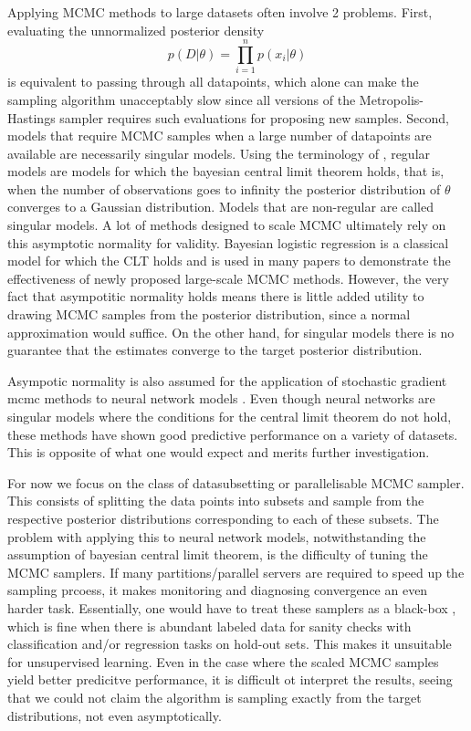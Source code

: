 \documentclass{book}
\begin{document}
\begin{enumerate}
\begin{algorithm}
{\end{algorithm}

Applying MCMC methods to large datasets often involve 2 problems. First, evaluating the unnormalized posterior density
\[ p(D|\theta) = \prod_{i=1}^n p(x_i|\theta) \]
 is equivalent to passing through all datapoints, which alone can make the sampling algorithm unacceptably slow since all versions of the Metropolis-Hastings sampler requires such evaluations for proposing new samples. Second, models that require MCMC samples when a large number of datapoints are available are necessarily singular models. Using the terminology of \cite{watanabe2009algebraic}, regular models are models for which the bayesian central limit theorem \cite{le2012asymptotic} holds, that is, when the number of observations goes to infinity the posterior distribution of $\theta$ converges to a Gaussian distribution. Models that are non-regular are called singular models. A lot of methods designed to scale MCMC \cite{neiswanger2013asymptotically,scott2016bayes,} ultimately rely on this asymptotic normality for validity. Bayesian logistic regression is a classical model for which the CLT holds and is used in many papers to demonstrate the effectiveness of newly proposed large-scale MCMC methods. However, the very fact that asympotitic normality holds means there is little added utility to drawing MCMC samples from the posterior distribution, since a normal approximation would suffice. On the other hand, for singular models there is no guarantee that the estimates converge to the target posterior distribution. 

Asympotic normality is also assumed for the application of stochastic gradient mcmc methods to neural network models \cite{welling2011bayesian,chen2014stochastic,ahn2012bayesian,ding2014bayesian,ma2015complete}. Even though neural networks are singular models where the conditions for the central limit theorem do not hold, these methods have shown good predictive performance on a variety of datasets. This is opposite of what one would expect and merits further investigation.

For now we focus on the class of datasubsetting or parallelisable MCMC sampler. This consists of 
splitting the data points into subsets and sample from the respective posterior distributions corresponding to each of these subsets. The problem with applying this to neural network models, notwithstanding the assumption of bayesian central limit theorem, is the difficulty of tuning the MCMC samplers. If many partitions/parallel servers are required to speed up the sampling prcoess, it makes monitoring and diagnosing convergence an even harder task. Essentially, one would have to treat these samplers as a black-box \cite{breiman2001statistical}, which is fine when there is abundant labeled data for sanity checks with classification and/or regression tasks on hold-out sets. This makes it unsuitable for unsupervised learning. Even in the case where the scaled MCMC samples yield better predicitve performance, it is difficult ot interpret the results, seeing that we could not claim the algorithm is sampling exactly from the target distributions, not even asymptotically. 


\end{enumerate}
\end{document}
